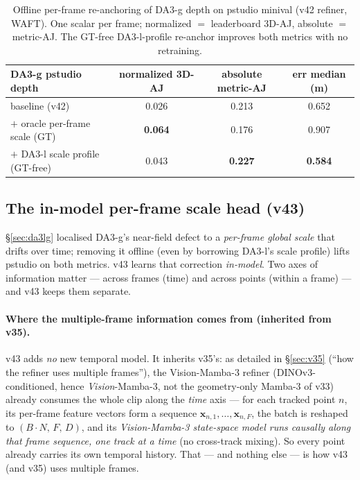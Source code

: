 \documentclass[11pt,a4paper]{article}
\begin{document}
\begin{table}[h]
\centering
\caption{Offline per-frame re-anchoring of DA3-g depth on pstudio minival (v42 refiner, WAFT). One scalar
per frame; normalized $=$ leaderboard 3D-AJ, absolute $=$ metric-AJ. The GT-free DA3-l-profile re-anchor
improves both metrics with no retraining.}
\label{tab:da3lg-reanchor}
\begin{tabular}{lccc}
\toprule
DA3-g pstudio depth & normalized 3D-AJ & absolute metric-AJ & err median (m) \\
\midrule
baseline (v42)                       & 0.026 & 0.213 & 0.652 \\
$+$ oracle per-frame scale (GT)      & \textbf{0.064} & 0.176 & 0.907 \\
$+$ DA3-l scale profile (GT-free)    & 0.043 & \textbf{0.227} & \textbf{0.584} \\
\bottomrule
\end{tabular}
\end{table}

\subsection{The in-model per-frame scale head (v43)}
\label{sec:v43}
\S\ref{sec:da3lg} localised DA3-g's near-field defect to a \emph{per-frame global scale} that drifts over
time; removing it offline (even by borrowing DA3-l's scale profile) lifts pstudio on both metrics. v43
learns that correction \emph{in-model}. Two axes of information matter --- across frames (time) and across
points (within a frame) --- and v43 keeps them separate.

\paragraph{Where the multiple-frame information comes from (inherited from v35).}
v43 adds \emph{no} new temporal model. It inherits v35's: as detailed in \S\ref{sec:v35} (``how the refiner
uses multiple frames''), the Vision-Mamba-3 refiner (DINOv3-conditioned, hence \emph{Vision}-Mamba-3, not
the geometry-only Mamba-3 of v33) already consumes the whole clip along the \emph{time} axis ---
for each tracked point $n$, its per-frame feature vectors form a sequence
$\mathbf{x}_{n,1},\dots,\mathbf{x}_{n,F}$, the batch is reshaped to $(B\!\cdot\!N,\,F,\,D)$, and its
\emph{Vision-Mamba-3 state-space model runs causally along that frame sequence, one track at a time} (no cross-track
mixing). So every point already carries its own temporal history. That --- and nothing else --- is how v43
(and v35) uses multiple frames.
\end{document}

